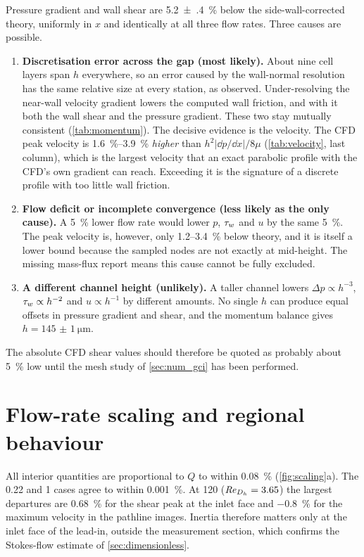 Pressure gradient and wall shear are \SI{5.2(4)}{\percent} below the side-wall-corrected theory, uniformly in $x$ and identically at all three flow rates. Three causes are possible.
\begin{enumerate}
\item \textbf{Discretisation error across the gap (most likely).} About nine cell layers span $h$ everywhere, so an error caused by the wall-normal resolution has the same relative size at every station, as observed. Under-resolving the near-wall velocity gradient lowers the computed wall friction, and with it both the wall shear and the pressure gradient. These two stay mutually consistent (\cref{tab:momentum}). The decisive evidence is the velocity. The CFD peak velocity is \SIrange{1.6}{3.9}{\percent} \emph{higher} than $h^2|\dd p/\dd x|/8\mu$ (\cref{tab:velocity}, last column), which is the largest velocity that an exact parabolic profile with the CFD's own gradient can reach. Exceeding it is the signature of a discrete profile with too little wall friction.
\item \textbf{Flow deficit or incomplete convergence (less likely as the only cause).} A \SI{5}{\percent} lower flow rate would lower $p$, $\tau_{w}$ and $u$ by the same \SI{5}{\percent}. The peak velocity is, however, only 1.2--\SI{3.4}{\percent} below theory, and it is itself a lower bound because the sampled nodes are not exactly at mid-height. The missing mass-flux report means this cause cannot be fully excluded.
\item \textbf{A different channel height (unlikely).} A taller channel lowers $\Delta p\propto h^{-3}$, $\tau_{w}\propto h^{-2}$ and $u\propto h^{-1}$ by different amounts. No single $h$ can produce equal offsets in pressure gradient and shear, and the momentum balance gives $h=\SI{145(1)}{\micro\metre}$.
\end{enumerate}
The absolute CFD shear values should therefore be quoted as probably about \SI{5}{\percent} low until the mesh study of \cref{sec:num_gci} has been performed.

\section{Flow-rate scaling and regional behaviour}
\label{sec:val_scaling}

All interior quantities are proportional to $Q$ to within \SI{0.08}{\percent} (\cref{fig:scaling}a). The 0.22 and \SI{1}{\uLmin} cases agree to within \SI{0.001}{\percent}. At \SI{120}{\uLmin} ($\mathit{Re}_{D_h}=3.65$) the largest departures are \SI{+0.68}{\percent} for the shear peak at the inlet face and \SI{-0.8}{\percent} for the maximum velocity in the pathline images. Inertia therefore matters only at the inlet face of the lead-in, outside the measurement section, which confirms the Stokes-flow estimate of \cref{sec:dimensionless}.

